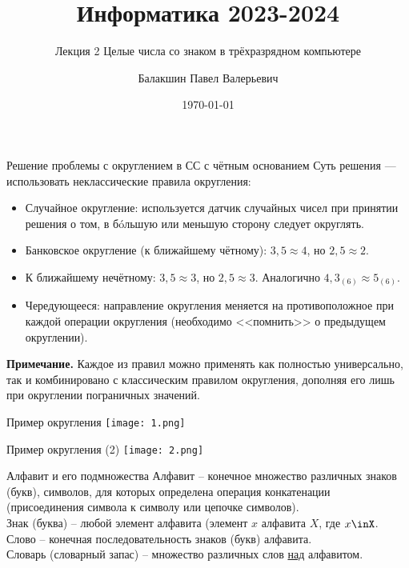 \documentclass{beamer}
\title[Информатика]{Информатика 2023-2024}
\subtitle{Лекция 2 Целые числа со знаком в трёхразрядном компьютере}
\author{Балакшин Павел Валерьевич}
\date{\today}
\begin{document}
\begin{frame}
    \titlepage
\end{frame}

\begin{frame}{Решение проблемы с округлением в СС с чётным основанием}
    Суть решения — использовать неклассические правила округления:
    \begin{itemize}
        \item \textcolor{custom_green}{Случайное округление}: используется датчик случайных чисел при принятии решения о том, в бóльшую или меньшую сторону следует округлять.
        \item \textcolor{custom_green}{Банковское округление} (к ближайшему чётному): \(3,5\approx4\), но \(2,5\approx2\).
        \item \textcolor{custom_green}{К ближайшему нечётному}: \(3,5\approx3\), но \(2,5\approx3\). Аналогично \(4,3_{(6)}\approx5_{(6)}\).
        \item \textcolor{custom_green}{Чередующееся}: направление округления меняется на противоположное при каждой операции округления (необходимо <<помнить>> о предыдущем округлении).
    \end{itemize}
    \textbf{Примечание.} Каждое из правил можно применять как полностью универсально, так и комбинировано с классическим правилом округления, дополняя его лишь при округлении пограничных значений.
\end{frame}

\begin{frame}{Пример округления}
    \texttt{[image: 1.png]}
\end{frame}

\begin{frame}{Пример округления (2)}
    \texttt{[image: 2.png]} %
\end{frame}

\begin{frame}{Алфавит и его подмножества}
    \textcolor{custom_green}{Алфавит} – конечное множество различных знаков (букв), символов, для которых определена операция конкатенации (присоединения символа к символу или цепочке символов). \\
    \textcolor{custom_green}{Знак (буква)} – любой элемент алфавита (элемент \(x\) алфавита \(X\), где \(x\inX\). \\
    \textcolor{custom_green}{Слово} – конечная последовательность знаков (букв) алфавита. \\
    \textcolor{custom_green}{Словарь (словарный запас)} – множество различных слов \underline{над} алфавитом.
\end{frame}
\end{document}
